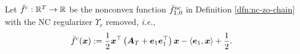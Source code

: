 \documentclass{article}
\begin{document}




\begin{dfn} \label{dfn:finite-Nes-func}
Let $\bar f^{\rm c}: {\mathbb{R}}^T \rightarrow {\mathbb{R}}$ be the nonconvex function $\bar f_{1,0}^{\rm nc}$ in Definition \ref{dfn:nc-zo-chain} with the NC regularizer $\Upsilon_r$ removed, \textit{i.e.},
\begin{align*}
    \bar f^{\rm c}(\vx) 
    &:= 
    \frac{1}{2} \vx^\top \left( \mA_T  +  \ve_1 \ve_1^\top \right) \vx - \langle \ve_1, \vx \rangle + \frac{1}{2}.    %
\end{align*}
\end{dfn}
\end{document}
